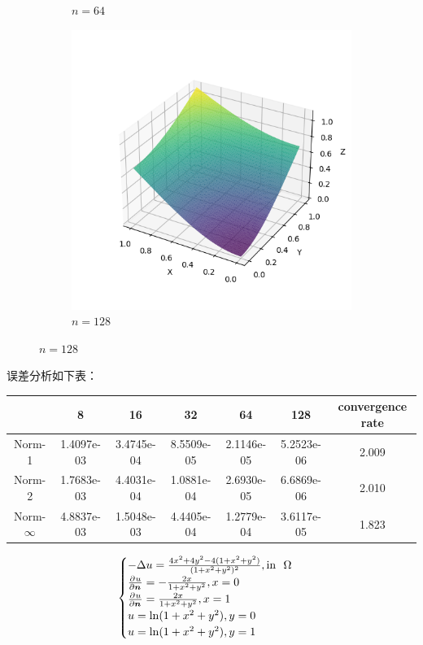 \documentclass[lang=cn,a4paper,newtx,bibend=bibtex]{elegantpaper}
\begin{document}
\begin{figure}[H]
\begin{subfigure}[b]{0.18\textwidth}
      \caption{$n = 64$}
  \end{subfigure}
  \hfill
  \begin{subfigure}[b]{0.18\textwidth}
      \includegraphics[width=\textwidth]{../../res_bac/res-[data|3-Neumann-regular-e128].png}
      \caption{$n = 128$}
  \end{subfigure}
\end{figure}

误差分析如下表：

\begin{table}[H]
  \centering
  \begin{tabular}{|c|c|c|c|c|c|c|}
  \hline
   & 8 & 16 & 32 & 64 & 128 & convergence rate \\
  \hline
  Norm-1 & 1.4097e-03 & 3.4745e-04 & 8.5509e-05 & 2.1146e-05 & 5.2523e-06 & 2.009 \\
  Norm-2 & 1.7683e-03 & 4.4031e-04 & 1.0881e-04 & 2.6930e-05 & 6.6869e-06 & 2.010 \\
  Norm-$\infty$ & 4.8837e-03 & 1.5048e-03 & 4.4405e-04 & 1.2779e-04 & 3.6117e-05 & 1.823 \\
  \hline
  \end{tabular}
  \end{table}


\[
\begin{cases}
  - \Delta u = \frac{4x^2 + 4y^2 - 4(1 + x^2 + y^2)}{(1 + x^2 + y^2)^2}, \text{in~~} \Omega\\
  \frac{\partial^{}{u}}{\partial {\bm{n}}^{}} = -\frac{2x}{1+x^2+y^2}, x = 0 \\
  \frac{\partial^{}{u}}{\partial {\bm{n}}^{}} = \frac{2x}{1+x^2+y^2}, x = 1 \\  
  u = \ln (1 + x^2 + y^2), y = 0 \\
  u = \ln (1 + x^2 + y^2), y = 1 \\  
\end{cases}
\]
\end{document}
